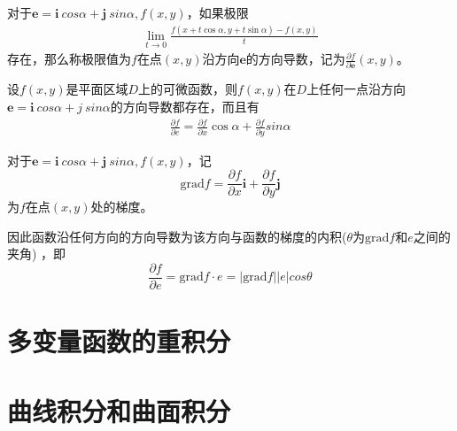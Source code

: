 \documentclass[lang=cn,10pt]{elegantbook}
\newcommand\bv[1]{\boldsymbol{#1}}
\begin{document}
\begin{definition}[方向导数]
    对于$\bv{e} = \bv{i}~cos\alpha+\bv{j}~sin\alpha,f(x,y)$，如果极限
    \begin{equation}
        \begin{aligned}
            \lim_{t\to0}\frac{f(x+t\cos\alpha,y+t\sin\alpha)-f(x,y)}t
        \end{aligned}
    \end{equation}
    存在，那么称极限值为$f$在点$(x,y)$沿方向$\bv{e}$的方向导数，记为$\frac{\partial f}{\partial \bv{e}}(x,y)$。
\end{definition}

\begin{theorem}
    设$f(x,y)$是平面区域$D$上的可微函数，则$f(x,y)$在$D$上任何一点沿方向
    $\bv{e} = \bv{i}~cos\alpha+j~sin\alpha$的方向导数都存在，而且有
    \begin{equation}
        \begin{aligned}
            \frac{\partial f}{\partial e}=\frac{\partial f}{\partial x}\cos\alpha+\frac{\partial f}{\partial y}sin\alpha
        \end{aligned}
    \end{equation}
\end{theorem}

\begin{definition}[梯度]
    对于$\bv{e} = \bv{i}~cos\alpha+\bv{j}~sin\alpha,f(x,y)$，记
    \begin{equation}
        \mathrm{grad}f=\frac{\partial f}{\partial x}\bv{i}+\frac{\partial f}{\partial y}\bv{j}
    \end{equation}
    为$f$在点$(x,y)$处的梯度。
\end{definition}

因此函数沿任何方向的方向导数为该方向与函数的梯度的内积($\theta$为$\mathrm{grad}f\text{和} e$之间的夹角)
，即
\begin{equation}
    \frac{\partial f}{\partial e} = \mathrm{grad}f\cdot e=|\mathrm{grad}f| |e|cos\theta
\end{equation}

\chapter{多变量函数的重积分}

\chapter{曲线积分和曲面积分}
\end{document}
